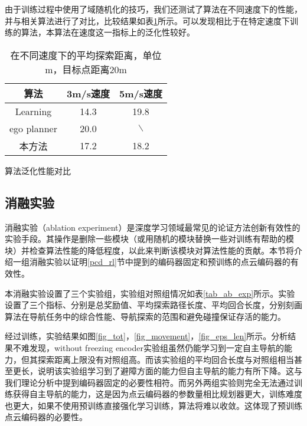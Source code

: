 由于训练过程中使用了域随机化的技巧，我们还测试了算法在不同速度下的性能，并与相关算法进行了对比，比较结果如表\ref{tab_generalize}所示。可以发现相比于在特定速度下训练的算法，本算法在速度这一指标上的泛化性较好。

\begin{table}
    \centering
    \begin{tabular}{ccc}
    \hline
        算法 & 3m/s速度 & 5m/s速度 \\ \hline
        Learning\cite{loquercio2021learning} & 14.3 & 19.8 \\ 
        ego planner\cite{zhou2020ego} & 20.0 & $\backslash$ \\ 
        本方法 & 17.2 & 18.2 \\ \hline
    \end{tabular}
    \caption{算法泛化性能对比}
    \caption*{在不同速度下的平均探索距离，单位m，目标点距离20m}
    \label{tab_generalize}
\end{table}

\subsection{消融实验}

消融实验（ablation experiment）是深度学习领域最常见的论证方法创新有效性的实验手段。其操作是删除一些模块（或用随机的模块替换一些对训练有帮助的模块）并检查算法性能的降低程度，以此来判断该模块对算法性能的贡献。本节将介绍一组消融实验以证明\ref{pcd_rl}节中提到的编码器固定和预训练的点云编码器的有效性。

本消融实验设置了三个实验组，实验组对照组情况如表\ref{tab_ab_exp}所示。实验设置了三个指标、分别是总奖励值、平均探索路径长度、平均回合长度，分别刻画算法在导航任务中的综合性能、导航探索的范围和避免碰撞保证存活的能力。

经过训练，实验结果如图\ref{fig_tot}，\ref{fig_movement}，\ref{fig_eps_len}所示。分析结果不难发现，without freezing encoder实验组虽然仍能学习到一定自主导航的能力，但其探索距离上限没有对照组高。而该实验组的平均回合长度与对照组相当甚至更长，说明该实验组学习到了避障方面的能力但自主导航的能力有所下降。这与我们理论分析中提到编码器固定的必要性相符。而另外两组实验则完全无法通过训练获得自主导航的能力，这是因为点云编码器的参数量相比规划器更大，训练难度也更大，如果不使用预训练直接强化学习训练，算法将难以收敛。这体现了预训练点云编码器的必要性。

